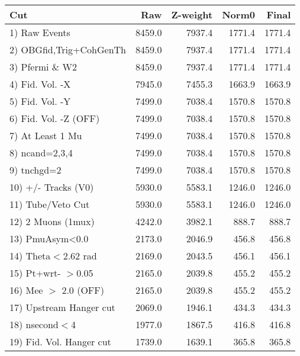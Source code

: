  \begin{table}[h!]\centering
 \begin{tabular}{||l||r|r|r|r||}
 \hline
 \hline
 Cut & Raw & Z-weight & Norm0 & Final \\
 \hline
  1) Raw Events           &      8459.0 &      7937.4 &      1771.4 &      1771.4 \\
  2) OBGfid,Trig+CohGenTh &      8459.0 &      7937.4 &      1771.4 &      1771.4 \\
  3) Pfermi \& W2         &      8459.0 &      7937.4 &      1771.4 &      1771.4 \\
  4) Fid. Vol. -X         &      7945.0 &      7455.3 &      1663.9 &      1663.9 \\
  5) Fid. Vol. -Y         &      7499.0 &      7038.4 &      1570.8 &      1570.8 \\
  6) Fid. Vol. -Z (OFF)   &      7499.0 &      7038.4 &      1570.8 &      1570.8 \\
  7) At Least 1 Mu        &      7499.0 &      7038.4 &      1570.8 &      1570.8 \\
  8) ncand=2,3,4          &      7499.0 &      7038.4 &      1570.8 &      1570.8 \\
  9) tnchgd=2             &      7499.0 &      7038.4 &      1570.8 &      1570.8 \\
 10) +/- Tracks (V0)      &      5930.0 &      5583.1 &      1246.0 &      1246.0 \\
 11) Tube/Veto Cut        &      5930.0 &      5583.1 &      1246.0 &      1246.0 \\
 12) 2 Muons (1mux)       &      4242.0 &      3982.1 &       888.7 &       888.7 \\
 13) PmuAsym<0.0          &      2173.0 &      2046.9 &       456.8 &       456.8 \\
 14) Theta$<$2.62 rad     &      2169.0 &      2043.5 &       456.1 &       456.1 \\
 15) Pt+wrt- $>$0.05      &      2165.0 &      2039.8 &       455.2 &       455.2 \\
 16) Mee $>$ 2.0  (OFF)   &      2165.0 &      2039.8 &       455.2 &       455.2 \\
 17) Upstream Hanger cut  &      2069.0 &      1946.1 &       434.3 &       434.3 \\
 18) nsecond$<$4          &      1977.0 &      1867.5 &       416.8 &       416.8 \\
 19) Fid. Vol. Hanger cut &      1739.0 &      1639.1 &       365.8 &       365.8 \\

\end{tabular}
\end{table}

